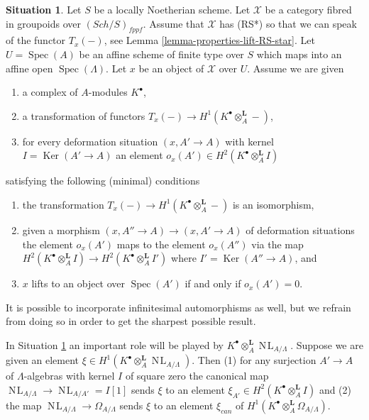 \documentclass{stacks-project}
\theoremstyle{plain}
\theoremstyle{definition}
\newtheorem{situation}[subsection]{Situation}
\theoremstyle{remark}
\numberwithin{equation}{subsection}
\def\Spec{\mathop{\mathrm{Spec}}}
\def\Sch{\mathit{Sch}}
\def\NL{\mathop{N\!L}\nolimits}
\def\Ker{\mathop{\mathrm{Ker}}}
\begin{document}
\begin{situation}
\label{situation-dual}
Let $S$ be a locally Noetherian scheme. Let $\mathcal{X}$ be a category
fibred in groupoids over $(\Sch/S)_{fppf}$. Assume that
$\mathcal{X}$ has (RS*) so that we can speak of the functor $T_x(-)$, see
Lemma \ref{lemma-properties-lift-RS-star}.
Let $U = \Spec(A)$ be an affine scheme of finite type over $S$ which maps
into an affine open $\Spec(\Lambda)$. Let $x$ be an object of $\mathcal{X}$
over $U$. Assume we are given
\begin{enumerate}
\item a complex of $A$-modules $K^\bullet$,
\item a transformation of functors
$T_x(-) \to H^1(K^\bullet \otimes_A^\mathbf{L} -)$,
\item for every deformation situation $(x, A' \to A)$ with kernel
$I = \Ker(A' \to A)$ an element
$o_x(A') \in H^2(K^\bullet \otimes_A^\mathbf{L} I)$
\end{enumerate}
satisfying the following (minimal) conditions
\begin{enumerate}
\item[(i)] the transformation
$T_x(-) \to H^1(K^\bullet \otimes_A^\mathbf{L} -)$
is an isomorphism,
\item[(ii)] given a morphism $(x, A'' \to A) \to (x, A' \to A)$ of deformation
situations the element $o_x(A')$ maps to the element $o_x(A'')$
via the map
$H^2(K^\bullet \otimes_A^\mathbf{L} I) \to
H^2(K^\bullet \otimes_A^\mathbf{L} I')$
where $I' = \Ker(A'' \to A)$, and
\item[(iii)] $x$ lifts to an object over $\Spec(A')$ if and only if
$o_x(A') = 0$.
\end{enumerate}
It is possible to incorporate infinitesimal automorphisms as well, but
we refrain from doing so in order to get the sharpest possible result.
\end{situation}

\noindent
In Situation \ref{situation-dual} an important role will be played by
$K^\bullet \otimes_A^\mathbf{L} \NL_{A/\Lambda}$. Suppose we are given an
element $\xi \in H^1(K^\bullet \otimes_A^\mathbf{L} \NL_{A/\Lambda})$.
Then (1) for any surjection $A' \to A$ of $\Lambda$-algebras with kernel
$I$ of square zero the canonical map $\NL_{A/\Lambda} \to \NL_{A/A'} = I[1]$
sends $\xi$ to an element $\xi_{A'} \in H^2(K^\bullet \otimes_A^\mathbf{L} I)$
and (2) the map $\NL_{A/\Lambda} \to \Omega_{A/\Lambda}$ sends
$\xi$ to an element $\xi_{can}$ of
$H^1(K^\bullet \otimes_A^\mathbf{L} \Omega_{A/\Lambda})$.
\end{document}
